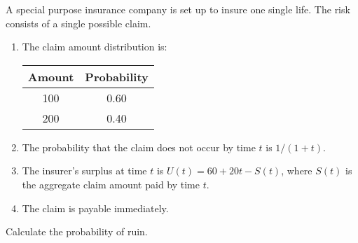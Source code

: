  A special purpose insurance company is set up to insure one single life. 
The risk consists of a single possible claim.
\begin{enumerate}
\item  The claim amount distribution is:
\begin{center}\begin{tabular}{|c|c|} \hline 
 Amount & Probability \\ \hline
   100  & 0.60 \\ 
   200  & 0.40 \\ \hline
\end{tabular}\end{center}
\item The probability that the claim does not occur by time $t$ 
     is $1/(1+t)$. 
\item The insurer's surplus at time $t$ is 
  $U(t) = 60 + 20t - S(t)$, where $S(t)$ is the aggregate claim
  amount paid by time $t$.
\item The claim is payable immediately.
\end{enumerate}
\bigskip

Calculate the probability of ruin.

